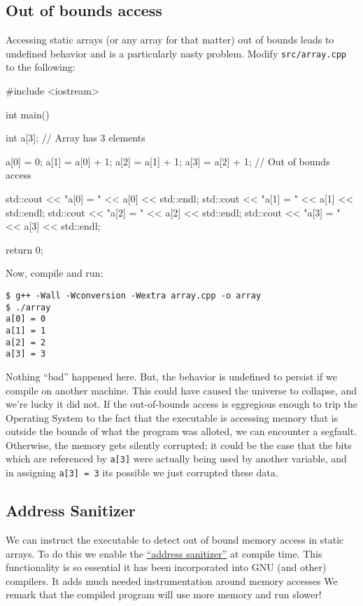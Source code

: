 \documentclass[12pt,letterpaper,twoside]{article}
\begin{document}
\hypertarget{out-of-bounds-access}{%
\subsection{Out of bounds access}\label{out-of-bounds-access}}

Accessing static arrays (or any array for that matter) out of bounds
leads to undefined behavior and is a particularly nasty problem. Modify
\texttt{src/array.cpp} to the following:

\begin{cpp}
#include <iostream>

int main() {
  int a[3]; // Array has 3 elements


  a[0] = 0;
  a[1] = a[0] + 1;
  a[2] = a[1] + 1;
  a[3] = a[2] + 1; // Out of bounds access


  std::cout << "a[0] = " << a[0] << std::endl;
  std::cout << "a[1] = " << a[1] << std::endl;
  std::cout << "a[2] = " << a[2] << std::endl;
  std::cout << "a[3] = " << a[3] << std::endl;

  return 0;
}
\end{cpp}

Now, compile and run:

\begin{verbatim}
$ g++ -Wall -Wconversion -Wextra array.cpp -o array
$ ./array
a[0] = 0
a[1] = 1
a[2] = 2
a[3] = 3
\end{verbatim}

Nothing ``bad'' happened here. But, the behavior is undefined to
persist if we compile on another machine. This could
have caused the universe to collapse, and we're lucky it did not. If
the out-of-bounds access is eggregious enough to trip the Operating
System to the fact that the executable is accessing memory that is
outside the bounds of what the program was alloted, we can encounter a
segfault. Otherwise, the memory gets silently corrupted; it could be
the case that the bits which are referenced by \texttt{a[3]} were
actually being used by another variable, and in assigning \texttt{a[3]
  = 3} its possible we just corrupted these data.

\subsection{Address Sanitizer}
We can instruct the executable to detect out of bound memory access in
static arrays. To do this we enable the
\href{https://en.wikipedia.org/wiki/AddressSanitizer}{``address
  sanitizer''} at compile time. This functionality is so essential it has been incorporated into GNU (and other) compilers.
It adds much needed instrumentation around memory accesses
We remark that the compiled program will use more memory and run slower!
\end{document}
